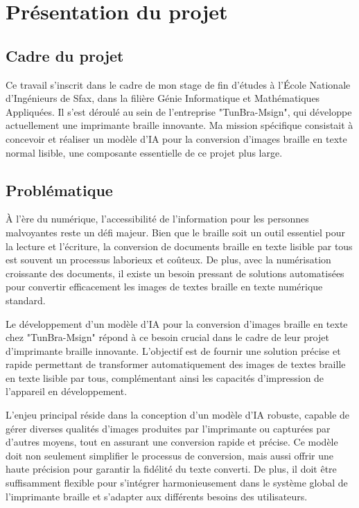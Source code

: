 \section{Présentation du projet}
\subsection{  Cadre du projet}
Ce travail s'inscrit dans le cadre de mon stage de fin d'études à l'École Nationale d'Ingénieurs de Sfax, dans la filière Génie Informatique et Mathématiques Appliquées. Il s'est déroulé au sein de l'entreprise "TunBra-Msign", qui développe actuellement une imprimante braille innovante. Ma mission spécifique consistait à concevoir et réaliser un modèle d'IA pour la conversion d'images braille en texte normal lisible, une composante essentielle de ce projet plus large. 
\subsection{Problématique}
À l'ère du numérique, l'accessibilité de l'information pour les personnes malvoyantes reste un défi majeur. Bien que le braille soit un outil essentiel pour la lecture et l'écriture, la conversion de documents braille en texte lisible par tous est souvent un processus laborieux et coûteux. De plus, avec la numérisation croissante des documents, il existe un besoin pressant de solutions automatisées pour convertir efficacement les images de textes braille en texte numérique standard.

Le développement d'un modèle d'IA pour la conversion d'images braille en texte chez "TunBra-Msign" répond à ce besoin crucial dans le cadre de leur projet d'imprimante braille innovante. L'objectif est de fournir une solution précise et rapide permettant de transformer automatiquement des images de textes braille en texte lisible par tous, complémentant ainsi les capacités d'impression de l'appareil en développement.

L'enjeu principal réside dans la conception d'un modèle d'IA robuste, capable de gérer diverses qualités d'images produites par l'imprimante ou capturées par d'autres moyens, tout en assurant une conversion rapide et précise. Ce modèle doit non seulement simplifier le processus de conversion, mais aussi offrir une haute précision pour garantir la fidélité du texte converti. De plus, il doit être suffisamment flexible pour s'intégrer harmonieusement dans le système global de l'imprimante braille et s'adapter aux différents besoins des utilisateurs.

